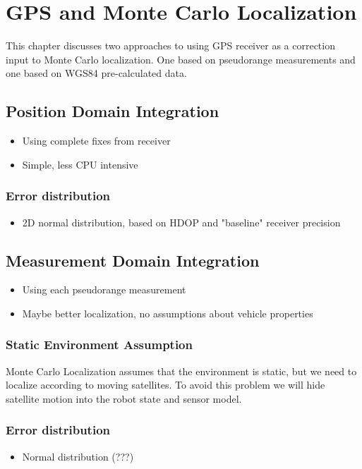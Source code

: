 \chapter{GPS and Monte Carlo Localization}
\label{chap:gps_and_mcl}

This chapter discusses two approaches to using GPS receiver as a correction input
to Monte Carlo localization. One based on pseudorange measurements and one based on
WGS84 pre-calculated data.



\section{Position Domain Integration}
\begin{itemize}
\item Using complete fixes from receiver
\item Simple, less CPU intensive
\end{itemize}

\subsection{Error distribution}
\begin{itemize}
\item 2D normal distribution, based on HDOP and "baseline" receiver precision
\end{itemize}

\section{Measurement Domain Integration}
\begin{itemize}
\item Using each pseudorange measurement
\item Maybe better localization, no assumptions about vehicle properties
\end{itemize}

\subsection{Static Environment Assumption}
\label{sec:gps-mcl-static-env}
Monte Carlo Localization assumes that the environment is static, but we need to
localize according to moving satellites.
To avoid this problem we will hide satellite motion into the robot state and sensor model.

\subsection{Error distribution}
\begin{itemize}
\item Normal distribution (???)
\end{itemize}

